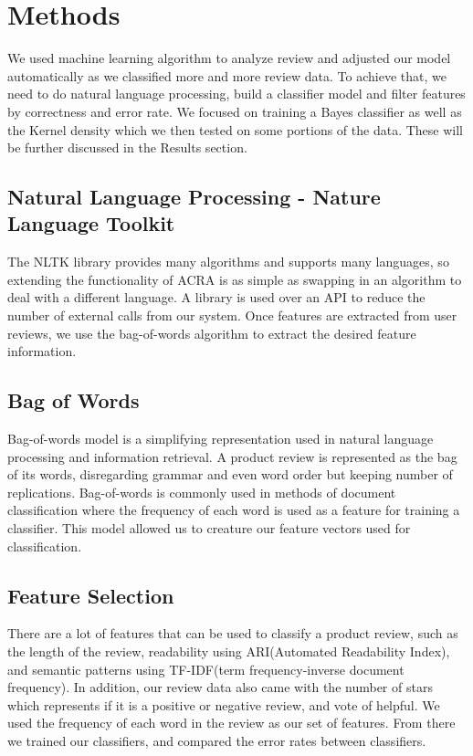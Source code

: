 \section{Methods}
We used machine learning algorithm to analyze review and adjusted our model automatically as we classified more and more review data. To achieve that, we need to do natural language processing, build a classifier model and filter features by correctness and error rate. We focused on training a Bayes classifier as well as the Kernel density which we then tested on some portions of the data.  These will be further discussed in the Results section.

\subsection{Natural Language Processing - Nature Language Toolkit}
The NLTK library provides many algorithms and supports many languages, so extending the functionality of ACRA is as simple as swapping in an algorithm to deal with a different language. A library is used over an API to reduce the number of external calls from our system. Once features are extracted from user reviews, we use the bag-of-words algorithm to extract the desired feature information. 

\subsection{Bag of Words}
Bag-of-words model is a simplifying representation used in natural language processing and information retrieval. A product review is represented as the bag of its words, disregarding grammar and even word order but keeping number of replications. Bag-of-words is commonly used in methods of document classification where the frequency of each word is used as a feature for training a classifier. This model allowed us to creature our feature vectors used for classification. 

\subsection{Feature Selection}
There are a lot of features that can be used to classify a product review, such as the length of the review, readability using ARI(Automated Readability Index), and semantic patterns using TF-IDF(term frequency-inverse document frequency). In addition, our review data also came with the number of stars which represents if it is a positive or negative review, and vote of helpful. We used the frequency of each word in the review as our set of features. From there we trained our classifiers, and compared the error rates between classifiers.


